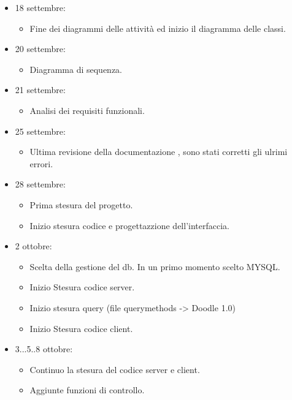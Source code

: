 \begin{itemize}
\begin{itemize}
\end{itemize}

\item 18 settembre:
\begin{itemize} 
	\item Fine dei diagrammi delle attività ed inizio il diagramma delle classi.
	
\end{itemize}
\item 20 settembre:
\begin{itemize} 
	\item Diagramma di sequenza.
	
\end{itemize}
\item 21 settembre:
\begin{itemize} 
	\item Analisi dei requisiti funzionali.
	
\end{itemize}

\item 25 settembre:
\begin{itemize} 
	\item Ultima revisione della documentazione , sono stati corretti gli ulrimi errori.
	
\end{itemize}

\item 28 settembre:
\begin{itemize} 
	\item Prima stesura del progetto.
	\item Inizio stesura codice e progettazzione dell'interfaccia.
	
\end{itemize}

\item 2 ottobre:
\begin{itemize} 
	\item Scelta della gestione del db. In un primo momento scelto MYSQL.
	\item Inizio Stesura codice server.
	\item Inizio stesura query (file querymethods -> Doodle 1.0)
	\item Inizio Stesura codice client.
	
\end{itemize}
\item 3...5..8 ottobre:
\begin{itemize} 
	\item Continuo la stesura del codice server e client.
	\item Aggiunte funzioni di controllo.
	

\end{itemize}
\end{itemize}
